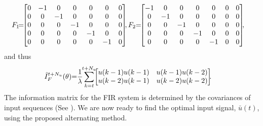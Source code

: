 \documentclass{ifacconf}
\begin{document}
\begin{equation}
\begin{split}
&F_1 \hspace{-0.15cm}=\hspace{-0.15cm}
		\begin{bmatrix}
			    0    &    -1      &     0     	&     0        	&   0 		&   0	 &   0 \\
				0    &    0       &    -1       &     0     		&   0     	&   0 	 &   0 \\
				0    &    0       &     0       &    -1   		&   0   	&   0 	 &   0 \\
				0    &    0       &     0       &     0     		&  - 1   	&   0  &   0 \\
				0    &    0       &     0       &     0     		&   0   	&  -1  &   0 \\
		\end{bmatrix}\hspace{-0.15cm},
F_2 \hspace{-0.10cm}=\hspace{-0.15cm}
		\begin{bmatrix}
			    -1   &    0       &     0     	&     0        	&   0 		&   0 &   0 \\
				0    &    -1      &     0       &     0     		&   0     	&   0	&   0 \\
				0    &    0       &    -1       &     0   		&   0   	&   0 &   0\\
				0    &    0       &     0       &     -1     		&   0   	&   0 &   0\\
				0    &    0       &     0       &     0     		&   -1   	&   0 &   0\\
		\end{bmatrix}\hspace{-0.15cm},
\end{split}
\end{equation}
and thus
\begin{eqnarray}
\begin{split}
\tilde{I}_F^{t+N_u}\hspace{0cm}(\theta) \hspace{-0.1cm}	&=\hspace{-0.1cm}	\frac{1}{\lambda}  \hspace{-0.1cm} \sum_{k=t}^{t+N_u}  \hspace{-0.15cm}
																\begin{bmatrix}
																 	u(k-1)u(k-1)	&  	u(k-1)u(k-2) \\
																 	u(k-2)u(k-1) 	&  	u(k-2)u(k-2)
																\end{bmatrix}
																\hspace{-0.15cm}.
\end{split}
\end{eqnarray}
The information matrix for the FIR system is determined by the covariances of input sequences (See \cite{Stoica1982}). We are now ready to find the optimal input signal, $\bar{u}(t)$, using the proposed alternating method.
\end{document}
